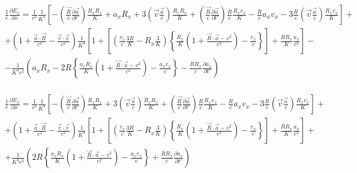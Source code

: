 \documentclass[11pt]{article}
\begin{document}
\[\begin{align}
  & \frac{1}{e}\frac{\partial {{E}_{x}}}{\partial x}=\frac{1}{{{c}^{2}}}\frac{1}{{{K}^{3}}}\left[ -\left( \frac{\overrightarrow{R}}{c}\frac{\partial \overrightarrow{a}}{\partial t'} \right)\frac{{{R}_{x}}{{R}_{x}}}{K}+{{a}_{x}}{{R}_{x}}+3\left( \overrightarrow{v}\frac{\overrightarrow{a}}{c} \right)\frac{{{R}_{x}}{{R}_{x}}}{K}+\left( \frac{\overrightarrow{R}}{c}\frac{\partial \overrightarrow{a}}{\partial t'} \right)\frac{R}{c}\frac{{{R}_{x}}{{v}_{x}}}{K}-\frac{R}{c}{{a}_{x}}{{v}_{x}}-3\frac{R}{c}\left( \overrightarrow{v}\frac{\overrightarrow{a}}{c} \right)\frac{{{R}_{x}}{{v}_{x}}}{K} \right]+ \\ 
 & +\left( 1+\frac{\overrightarrow{a}\cdot \overrightarrow{R}}{{{c}^{2}}}-\frac{\overrightarrow{v}\cdot \overrightarrow{v}}{{{c}^{2}}} \right)\frac{1}{{{K}^{3}}}\left[ 1+\left[ \left( \frac{{{v}_{x}}}{c}\frac{3R}{K}-{{R}_{x}}\frac{3}{K} \right)\left\{ \frac{{{R}_{x}}}{K}\left( 1+\frac{\overrightarrow{R}\cdot \overrightarrow{a}-{{v}^{2}}}{{{c}^{2}}} \right)-\frac{{{v}_{x}}}{c} \right\} \right]+\frac{R{{R}_{x}}}{K}\frac{{{a}_{x}}}{{{c}^{2}}} \right]- \\
 & -\frac{1}{{{K}^{3}}{{c}^{2}}}\left( {{a}_{x}}{{R}_{x}}-2R\left\{ \frac{{{a}_{x}}{{R}_{x}}}{K}\left( 1+\frac{\overrightarrow{R}\cdot \overrightarrow{a}-{{v}^{2}}}{{{c}^{2}}} \right)-\frac{{{a}_{x}}{{v}_{x}}}{c} \right\}-\frac{R{{R}_{x}}}{c}\frac{\partial {{a}_{x}}}{\partial t'} \right) \\
\end{align}\]

\[\begin{align}
  & \frac{1}{e}\frac{\partial {{E}_{x}}}{\partial x}=\frac{1}{{{c}^{2}}}\frac{1}{{{K}^{3}}}\left[ -\left( \frac{\overrightarrow{R}}{c}\frac{\partial \overrightarrow{a}}{\partial t'} \right)\frac{{{R}_{x}}{{R}_{x}}}{K}+3\left( \overrightarrow{v}\frac{\overrightarrow{a}}{c} \right)\frac{{{R}_{x}}{{R}_{x}}}{K}+\left( \frac{\overrightarrow{R}}{c}\frac{\partial \overrightarrow{a}}{\partial t'} \right)\frac{R}{c}\frac{{{R}_{x}}{{v}_{x}}}{K}-\frac{R}{c}{{a}_{x}}{{v}_{x}}-3\frac{R}{c}\left( \overrightarrow{v}\frac{\overrightarrow{a}}{c} \right)\frac{{{R}_{x}}{{v}_{x}}}{K} \right]+ \\ 
 & +\left( 1+\frac{\overrightarrow{a}\cdot \overrightarrow{R}}{{{c}^{2}}}-\frac{\overrightarrow{v}\cdot \overrightarrow{v}}{{{c}^{2}}} \right)\frac{1}{{{K}^{3}}}\left[ 1+\left[ \left( \frac{{{v}_{x}}}{c}\frac{3R}{K}-{{R}_{x}}\frac{3}{K} \right)\left\{ \frac{{{R}_{x}}}{K}\left( 1+\frac{\overrightarrow{R}\cdot \overrightarrow{a}-{{v}^{2}}}{{{c}^{2}}} \right)-\frac{{{v}_{x}}}{c} \right\} \right]+\frac{R{{R}_{x}}}{K}\frac{{{a}_{x}}}{{{c}^{2}}} \right]+ \\
 & +\frac{1}{{{K}^{3}}{{c}^{2}}}\left( 2R\left\{ \frac{{{a}_{x}}{{R}_{x}}}{K}\left( 1+\frac{\overrightarrow{R}\cdot \overrightarrow{a}-{{v}^{2}}}{{{c}^{2}}} \right)-\frac{{{a}_{x}}{{v}_{x}}}{c} \right\}+\frac{R{{R}_{x}}}{c}\frac{\partial {{a}_{x}}}{\partial t'} \right) \\
\end{align}\]
\end{document}
